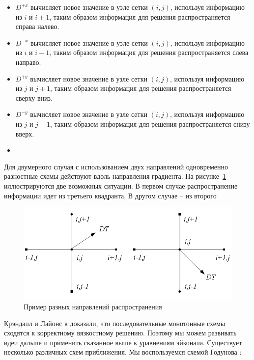\documentclass[a4paper,12pt]{article}
\begin{document}
\begin{itemize}
\item $D^{+x}$ вычисляет новое значение в узле сетки $(i,j)$, используя
  информацию из $i$ и $i+1$, таким образом информация для решения
  распространяется справа налево.

\item $D^{-x}$ вычисляет новое значение в узле сетки $(i,j)$, используя
  информацию из $i$ и $i-1$, таким образом информация для решения
  распространяется слева направо.
\item $D^{+y}$ вычисляет новое значение в узле сетки $(i,j)$, используя
  информацию из $j$ и $j+1$, таким образом информация для решения
  распространяется сверху вниз.

\item $D^{-y}$ вычисляет новое значение в узле сетки $(i,j)$, используя
  информацию из $j$ и $j-1$, таким образом информация для решения
  распространяется снизу вверх.

\item 
\end{itemize}


Для двумерного случая с использованием двух направлений одновременно
разностные схемы действуют вдоль направления градиента. На
рисунке~\ref{fig:upwind-schema} иллюстрируются две возможных
ситуации. В первом случае распространение информации идет из третьего
квадранта, В другом случае -- из второго
\begin{figure}[H]
  \centering
  \includegraphics[width=\linewidth]{img/upwind-schema.png}
  \hfil \caption{Пример разных направлений распространения}
  \label{fig:upwind-schema}

\end{figure}

Крэндалл и Лайонс в \cite{V1983} доказали, что последовательные
монотонные схемы сходятся к корректному вязкостному решению. Поэтому
мы можем развивать идеи дальше и применить сказанное выше к уравнениям
эйконала. Существует несколько различных схем приближения. Мы
воспользуемся схемой Годунова \cite{G1956,F2002}:
\end{document}
